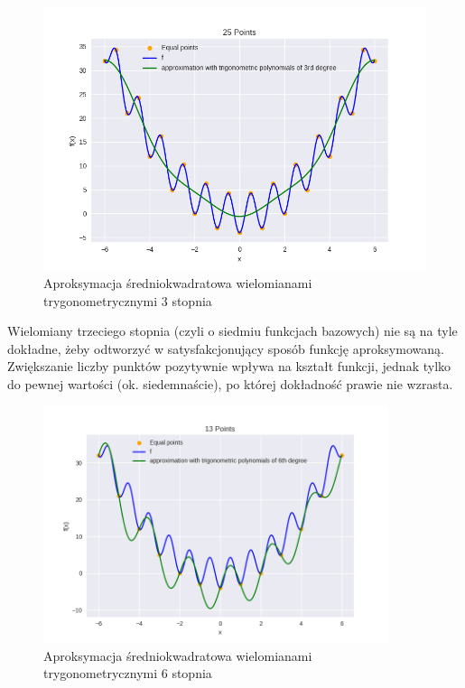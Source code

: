\documentclass{article}
\begin{document}
\begin{figure}[H]
    \centering
    \includegraphics[width=\textwidth]{img/tripoly_3_25.png}
    \caption{Aproksymacja średniokwadratowa wielomianami trygonometrycznymi 3 stopnia}
\end{figure}

Wielomiany trzeciego stopnia (czyli o siedmiu funkcjach bazowych) nie są na tyle dokładne, żeby odtworzyć w satysfakcjonujący
sposób funkcję aproksymowaną. Zwiększanie liczby punktów pozytywnie wpływa na kształt funkcji, jednak tylko do pewnej wartości
(ok. siedemnaście), po której dokładność prawie nie wzrasta.

\begin{figure}[H]
    \centering
    \includegraphics[width=0.9\textwidth]{img/tripoly_6_13.png}
    \caption{Aproksymacja średniokwadratowa wielomianami trygonometrycznymi 6 stopnia}
\end{figure}
\end{document}
